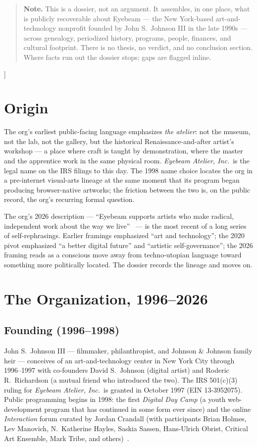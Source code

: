 \documentclass[10pt,letterpaper,twocolumn]{article}
\begin{document}
{\begin{quote}
\small\noindent\textbf{Note.} This is a dossier, not an argument. It assembles, in one place, what is publicly recoverable about Eyebeam --- the New York-based art-and-technology nonprofit founded by John S.~Johnson III in the late 1990s --- across genealogy, periodized history, programs, people, finances, and cultural footprint. There is no thesis, no verdict, and no conclusion section. Where facts run out the dossier stops; gaps are flagged inline.
\end{quote}
\vspace{0.5em}
}]

\section{Origin}

The org's earliest public-facing language emphasizes \emph{the atelier}: not the museum, not the lab, not the gallery, but the historical Renaissance-and-after artist's workshop --- a place where craft is taught by demonstration, where the master and the apprentice work in the same physical room. \emph{Eyebeam Atelier, Inc.}~is the legal name on the IRS filings to this day. The 1998 name choice locates the org in a pre-internet visual-arts lineage at the same moment that its program began producing browser-native artworks; the friction between the two is, on the public record, the org's recurring formal question.

The org's 2026 description --- ``Eyebeam supports artists who make radical, independent work about the way we live''~\citep{eyebeam2026about} --- is the most recent of a long series of self-rephrasings. Earlier framings emphasized ``art and technology''; the 2020 pivot emphasized ``a better digital future'' and ``artistic self-governance''; the 2026 framing reads as a conscious move away from techno-utopian language toward something more politically located. The dossier records the lineage and moves on.

\section{The Organization, 1996--2026}

\subsection{Founding (1996--1998)}

John S.~Johnson III --- filmmaker, philanthropist, and Johnson \& Johnson family heir --- conceives of an art-and-technology center in New York City through 1996--1997 with co-founders David S.~Johnson (digital artist) and Roderic R.~Richardson (a mutual friend who introduced the two). The IRS 501(c)(3) ruling for \emph{Eyebeam Atelier, Inc.}~is granted in October 1997 (EIN 13-3952075). Public programming begins in 1998: the first \emph{Digital Day Camp} (a youth web-development program that has continued in some form ever since) and the online \emph{Interaction} forum curated by Jordan Crandall (with participants Brian Holmes, Lev Manovich, N.~Katherine Hayles, Saskia Sassen, Hans-Ulrich Obrist, Critical Art Ensemble, Mark Tribe, and others)~\citep{wikipedia2026eyebeam}.
\end{document}
